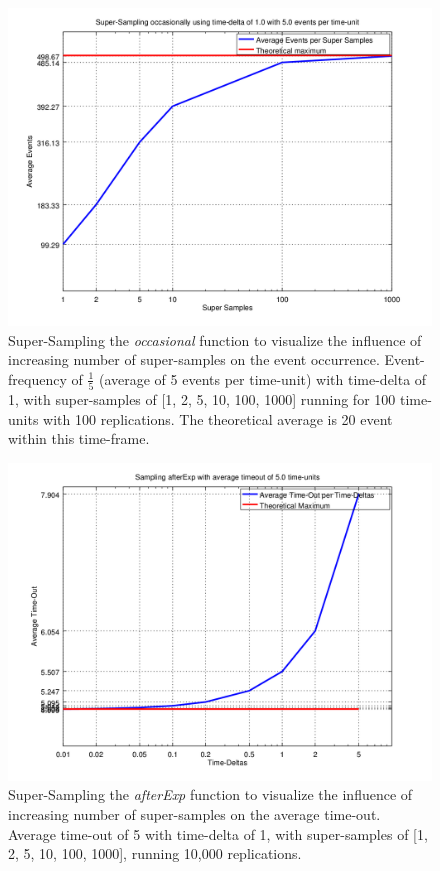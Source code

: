 \begin{figure}
	\centering
	\includegraphics[width=.6\textwidth, angle=0]{./../shared/fig/samplingTest_occasionally_ss_5evts.png}
	\caption{Super-Sampling the \textit{occasional} function to visualize the influence of increasing number of super-samples on the event occurrence. Event-frequency of $\frac{1}{5}$ (average of 5 events per time-unit) with time-delta of 1, with super-samples of [1, 2, 5, 10, 100, 1000] running for 100 time-units with 100 replications. The theoretical average is 20 event within this time-frame.}
	\label{fig:sampling_occasionally_ss_5evts}
\end{figure}

\begin{figure}
	\centering
	\includegraphics[width=.6\textwidth, angle=0]{./../shared/fig/samplingTest_afterExp_5time.png}
	\caption{Super-Sampling the \textit{afterExp} function to visualize the influence of increasing number of super-samples on the average time-out. Average time-out of 5 with time-delta of 1, with super-samples of [1, 2, 5, 10, 100, 1000], running 10,000 replications.}
	\label{fig:sampling_afterExp_ss_5time}
\end{figure}

